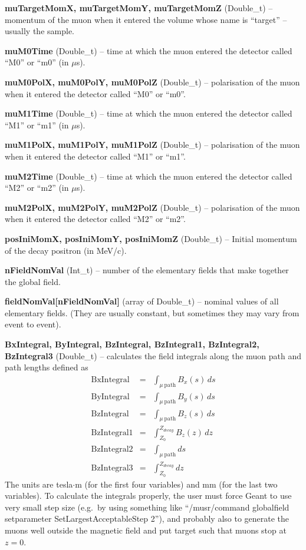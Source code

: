 \documentclass[twoside]{dis04}
\begin{document}
\begin{description}
\item{\bf muTargetMomX, muTargetMomY, muTargetMomZ} (Double\_t) -- momentum of the muon when it entered the volume whose name is ``target'' -- usually the sample.
\item{\bf muM0Time}  (Double\_t) -- time at which the muon entered the detector called ``M0'' or ``m0'' (in $\mu$s).
\item{\bf muM0PolX, muM0PolY, muM0PolZ}  (Double\_t) -- polarisation of the muon when it entered the detector called ``M0'' or ``m0''.
\item{\bf muM1Time}  (Double\_t) -- time at which the muon entered the detector called ``M1'' or ``m1'' (in $\mu$s).
\item{\bf muM1PolX, muM1PolY, muM1PolZ}  (Double\_t) -- polarisation of the muon when it entered the detector called ``M1'' or ``m1''.
\item{\bf muM2Time}  (Double\_t) -- time at which the muon entered the detector called ``M2'' or ``m2'' (in $\mu$s).
\item{\bf muM2PolX, muM2PolY, muM2PolZ}  (Double\_t) -- polarisation of the muon when it entered the detector called ``M2'' or ``m2''.
\item{\bf posIniMomX,   posIniMomY, posIniMomZ}  (Double\_t) -- Initial momentum of the decay positron (in MeV/c).
\item{\bf nFieldNomVal} (Int\_t) -- number of the elementary fields that make together the global field.
\item{\bf fieldNomVal[nFieldNomVal]} (array of Double\_t) -- nominal values of all elementary fields.  
	(They are usually constant, but sometimes they may vary from event to event).
\item{\bf BxIntegral, ByIntegral, BzIntegral, BzIntegral1, BzIntegral2, BzIntegral3} (Double\_t) --
	calculates the field integrals along the muon path and path lengths defined as
	\begin{eqnarray}
	\mathrm{BxIntegral} & = & \int_{\mu\ \mathrm{path}} B_x(s)\, ds  \\
	\mathrm{ByIntegral} & = & \int_{\mu\ \mathrm{path}} B_y(s)\, ds  \\
	\mathrm{BzIntegral} & = & \int_{\mu\ \mathrm{path}} B_z(s)\, ds  \\
        \mathrm{BzIntegral1} & = & \int_{Z_0}^{Z_{decay}} B_z(z)\, dz  \\
	\mathrm{BzIntegral2} & = & \int_{\mu\ \mathrm{path}} ds  \\
        \mathrm{BzIntegral3} & = & \int_{Z_0}^{Z_{decay}} dz  
	\end{eqnarray}
	The units are tesla$\cdot$m (for the first four variables) and mm (for the last two variables).
	To calculate the integrals properly, the user must force Geant to use very small step size
 	(e.g.\ by using something like ``/musr/command globalfield setparameter SetLargestAcceptableStep 2''),
	and probably also to generate the muons well outside the magnetic field and put target such
	that muons stop at $z=0$.


\end{description}
\end{document}
